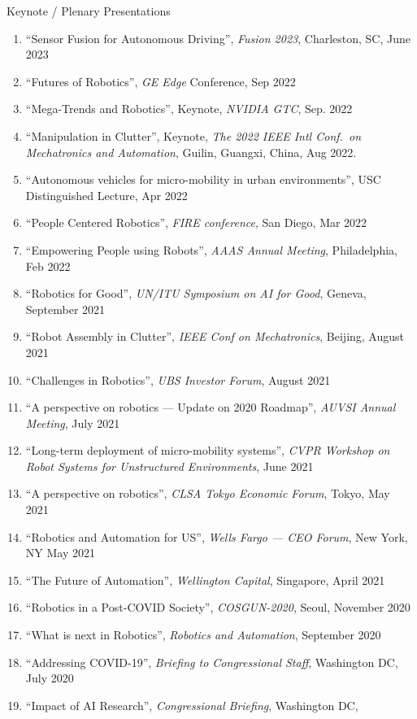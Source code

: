 \documentclass{article}
\begin{document}
\begin{cv}
\begin{cvlist}{Keynote / Plenary Presentations}
\begin{enumerate}
			\item ``Sensor Fusion for Autonomous Driving'', {\em Fusion 2023}, Charleston,
			      SC, June 2023
			\item ``Futures of Robotics'', {\em GE Edge\/} Conference, Sep 2022
			\item ``Mega-Trends and Robotics'', Keynote, {\em NVIDIA GTC}, Sep. 2022
			\item ``Manipulation in Clutter'', Keynote, {\em The 2022 IEEE Intl Conf.\ on
					      Mechatronics and Automation}, Guilin, Guangxi, China, Aug 2022.
			\item ``Autonomous vehicles for micro-mobility in urban environments'', USC
			      Distinguished Lecture, Apr 2022
			\item ``People Centered Robotics'', {\em FIRE conference}, San Diego, Mar
			      2022
			\item ``Empowering People using Robots'', {\em AAAS Annual Meeting},
			      Philadelphia, Feb 2022
			\item ``Robotics for Good'', {\em UN/ITU Symposium on AI for Good}, Geneva,
			      September 2021
			\item ``Robot Assembly in Clutter'', {\em IEEE Conf on Mechatronics}, Beijing,
			      August 2021
			\item ``Challenges in Robotics'', {\em UBS Investor Forum}, August 2021
			\item ``A perspective on robotics --- Update on 2020 Roadmap'', {\em AUVSI
				      Annual Meeting}, July 2021
			\item ``Long-term deployment of micro-mobility systems'', {\em CVPR Workshop on
				      Robot Systems for Unstructured Environments}, June 2021
			\item ``A perspective on robotics'', {\em CLSA Tokyo Economic Forum}, Tokyo, May
			      2021
			\item ``Robotics and Automation for US'', {\em Wells Fargo --- CEO Forum}, New
			      York, NY May 2021
			\item ``The Future of Automation'', {\em Wellington Capital}, Singapore,
			      April 2021
			\item ``Robotics in a Post-COVID Society'', {\em COSGUN-2020}, Seoul, November
			      2020
			\item ``What is next in Robotics'', {\em Robotics and Automation}, September
			      2020
			\item ``Addressing COVID-19'', {\em Briefing to Congressional Staff}, Washington
			      DC, July 2020
			\item ``Impact of AI Research'', {\em Congressional Briefing}, Washington DC,

\end{enumerate}
\end{cvlist}
\end{cv}
\end{document}

